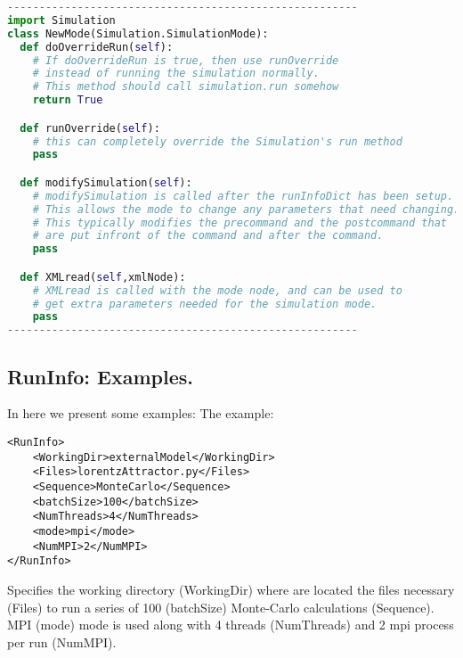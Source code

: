 \begin{lstlisting}[language=python]
-------------------------------------------------------
import Simulation
class NewMode(Simulation.SimulationMode):
  def doOverrideRun(self):
    # If doOverrideRun is true, then use runOverride 
    # instead of running the simulation normally.  
    # This method should call simulation.run somehow 
    return True

  def runOverride(self):
    # this can completely override the Simulation's run method
    pass

  def modifySimulation(self):
    # modifySimulation is called after the runInfoDict has been setup.
    # This allows the mode to change any parameters that need changing.
    # This typically modifies the precommand and the postcommand that
    # are put infront of the command and after the command.
    pass

  def XMLread(self,xmlNode):
    # XMLread is called with the mode node, and can be used to
    # get extra parameters needed for the simulation mode.
    pass
-------------------------------------------------------
\end{lstlisting}
\subsection{RunInfo: Examples.}
\label{subsec:runinfoexamples}
In here we present some examples:
The example:
\begin{lstlisting}[style=XML]
<RunInfo>
    <WorkingDir>externalModel</WorkingDir>
    <Files>lorentzAttractor.py</Files>
    <Sequence>MonteCarlo</Sequence>
    <batchSize>100</batchSize>
    <NumThreads>4</NumThreads>    
    <mode>mpi</mode>
    <NumMPI>2</NumMPI>
</RunInfo>
\end{lstlisting}
Specifies the working directory (WorkingDir) where are located the files necessary (Files) to run a series of 100 (batchSize) Monte-Carlo calculations (Sequence).
MPI (mode) mode is used along with 4 threads (NumThreads) and 2 mpi process per run (NumMPI).
